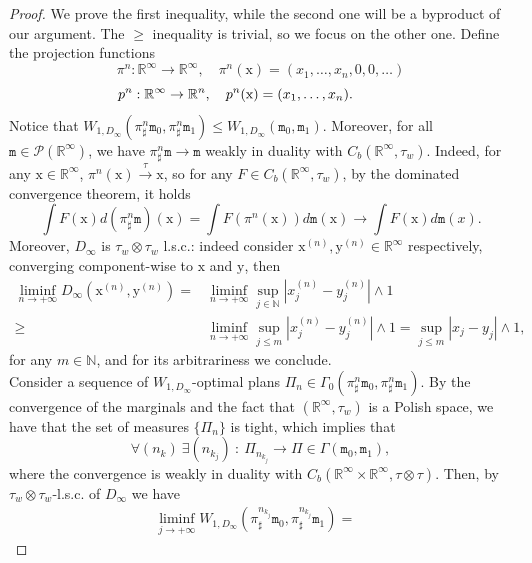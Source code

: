 \documentclass[10pt,leqno]{amsart}
\numberwithin{equation}{section}
\newcommand{\R}{\mathbb{R}}
\newcommand{\N}{\mathbb{N}}
\newcommand{\PP}{\mathcal{P}}
\begin{document}
\begin{proof}
We prove the first inequality, while the second one will be a byproduct of our argument.
    The $\geq$ inequality is trivial, so we focus on the other one. Define the projection functions
    \[\pi^n:\R^\infty \to \R^\infty, \quad \pi^n(\mathrm{x}) = (x_1,\dots,x_n,0,0,\dots)\]
    \[ \hspace{-1,3cm}p^n:\R^\infty\to\R^n, \quad p^n(\mathrm{x})= (x_1,\dots,x_n).\]
    Notice that $W_{1,D_\infty}(\pi^n_\sharp \mathtt{m}_0,\pi^n_\sharp \mathtt{m}_1)\leq W_{1,D_\infty}(\mathtt{m}_0,\mathtt{m}_1)$. Moreover, for all $\mathtt{m}\in \PP(\R^\infty)$, we have $\pi^n_\sharp \mathtt{m}\to\mathtt{m}$ weakly in duality with $C_b(\R^\infty,\tau_w)$. Indeed, for any $\mathrm{x}\in \R^\infty$, $\pi^n(\mathrm{x})\overset{\tau}{\to}\mathrm{x}$, so for any $F\in C_b(\R^\infty,\tau_w)$, by the dominated convergence theorem, it holds
    \[\int F(\mathrm{x}) d(\pi^n_\sharp \mathtt{m})(\mathrm{x}) = \int F(\pi^n(\mathrm{x})) d\mathtt{m}(\mathrm{x}) \to \int F(\mathrm{x}) d\mathtt{m}(x).\]
    Moreover, $D_\infty$ is $\tau_w \otimes \tau_w$ l.s.c.: indeed consider $\mathrm{x}^{(n)},\mathrm{y}^{(n)}\in \R^\infty$ respectively, converging component-wise to $\mathrm{x}$ and $\mathrm{y}$, then 
    \begin{align*}
        \liminf_{n\to+\infty} D_\infty(\mathrm{x}^{(n)},\mathrm{y}^{(n)}) 
        = &
        \liminf_{n\to+\infty} \sup_{j\in \N} |x_j^{(n)} - y_j^{(n)}|\wedge 1 
        \\
        \geq &
        \liminf_{n\to+\infty} \sup_{j\leq m} |x_j^{(n)} - y_j^{(n)}|\wedge 1 = \sup_{j\leq m} |x_j - y_j|\wedge 1,
    \end{align*}
    for any $m\in \N$, and for its arbitrariness we conclude. 
    \\
    Consider a sequence of $W_{1,D_\infty}$-optimal plans $\Pi_n \in \Gamma_0(\pi^n_\sharp \mathtt{m}_0,\pi^n_\sharp \mathtt{m}_1)$. By the convergence of the marginals and the fact that $(\R^\infty,\tau_w)$ is a Polish space, we have that the set of measures $\{\Pi_n\}$ is tight, which implies that 
    \[\forall (n_k) \ \exists (n_{k_j}) \ : \ \Pi_{n_{k_j}} \to \Pi\in\Gamma(\mathtt{m}_0,\mathtt{m}_1),\]
    where the convergence is weakly in duality with $C_b(\R^\infty\times\R^\infty, \tau\otimes\tau)$. Then, by $\tau_w\otimes\tau_w$-l.s.c. of $D_\infty$ we have 
    \begin{align*}
        \liminf_{j\to+\infty} W_{1,D_\infty}(\pi^{n_{k_j}}_\sharp \mathtt{m}_0,\pi^{n_{k_j}}_\sharp \mathtt{m}_1) 
        = &

\end{align*}
\end{proof}
\end{document}
